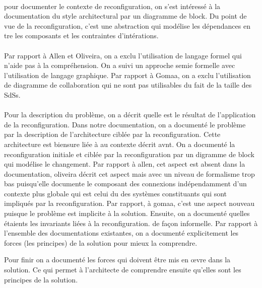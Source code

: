 \paragraph{}
pour documenter le contexte de reconfiguration, on s'est intéressé à
la documentation du style architectural par un diagramme de block. Du
point de vue de la reconfiguration, c'est une abstraction qui modélise
les dépendances en tre les composants et les contraintes
d'intérations. 

\paragraph{}
Par rapport à Allen et Oliveira, on a exclu l'utilisation de langage
formel qui n'aide pas à la compréhension. On a suivi un approche semie
formelle avec l'utilisation de langage graphique. Par rapport à Gomaa,
on a exclu l'utilisation de diagramme de collaboration qui ne sont pas
utilisables du fait de la taille des SdSs. 

\paragraph{}
Pour la description du problème, on a décrit quelle est le résultat de
l'application de la reconfiguration. 
%
Dans notre documentation, on a documenté le problème par la
description de l'architecture ciblée par la reconfiguration. Cette
architecture est biensure liée à au contexte décrit avnt. On a
documenté la reconfiguration initiale et ciblée par la reconfiguration
par un digramme de block qui modélise le changement. 
%
Par rapport à allen, cet aspect
est absent dans la documentation,
oliveira décrit cet aspect mais avec un niveau de formalisme trop bas
puisqu'elle documente le composant des connexions indépendamment d'un
contexte plus globale qui est celui du des systèmes
constituants qui sont impliqués par la reconfiguration. Par rapport, à
gomaa, c'est une aspect nouveau puisque le problème est implicite à la
solution. 
%
%
Ensuite, on a documenté quelles étaients les invariants liées à la
reconfiguration. de façon informelle.  Par rapport à l'ensemble des
documentations existantes, on a documenté explicitement les forces
(les principes) de la solution pour mieux la comprendre.
%

Pour finir on a documenté les forces qui doivent être mis en \oe{}vre
dans la solution. Ce qui permet à l'architecte de comprendre ensuite
qu'elles sont les principes de la solution. 

